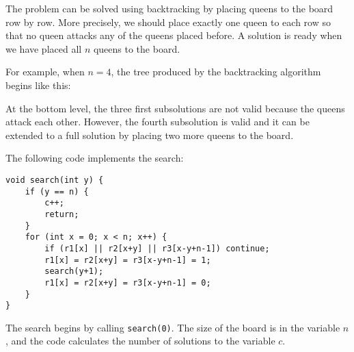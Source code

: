 The problem can be solved using backtracking
by placing queens to the board row by row.
More precisely, we should place exactly one queen
to each row so that no queen attacks
any of the queens placed before.
A solution is ready when we have placed all
$n$ queens to the board.

For example, when $n=4$, the tree produced by
the backtracking algorithm begins like this:

\begin{center}
\end{center}

At the bottom level, the three first subsolutions
are not valid because the queens attack each other.
However, the fourth subsolution is valid
and it can be extended to a full solution by
placing two more queens to the board.

\begin{samepage}
The following code implements the search:
\begin{lstlisting}
void search(int y) {
    if (y == n) {
        c++;
        return;
    }
    for (int x = 0; x < n; x++) {
        if (r1[x] || r2[x+y] || r3[x-y+n-1]) continue;
        r1[x] = r2[x+y] = r3[x-y+n-1] = 1;
        search(y+1);
        r1[x] = r2[x+y] = r3[x-y+n-1] = 0;
    }
}
\end{lstlisting}
\end{samepage}
The search begins by calling \texttt{search(0)}.
The size of the board is in the variable $n$,
and the code calculates the number of solutions
to the variable $c$.


